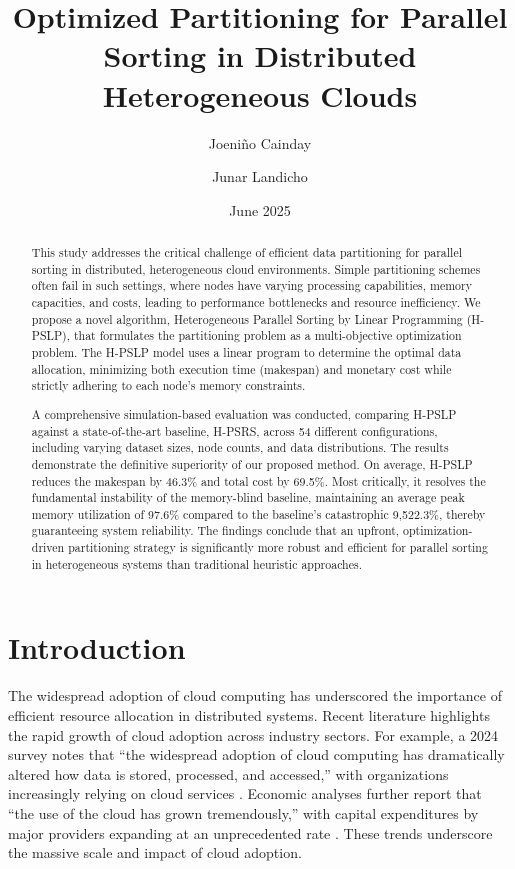 \documentclass{article}
\title{Optimized Partitioning for Parallel Sorting in Distributed Heterogeneous Clouds}
\author[]{Joeniño Cainday}
\author[]{Junar Landicho}
\affil[]{University of Science and Technology of Southern Philippines, Cagayan de Oro, 9000, Philippines}
\date{June 2025}
\begin{document}
\maketitle

\begin{abstract}
This study addresses the critical challenge of efficient data partitioning for parallel sorting in distributed, heterogeneous cloud environments.  Simple partitioning schemes often fail in such settings, where nodes have varying processing capabilities, memory capacities, and costs, leading to performance bottlenecks and resource inefficiency.  We propose a novel algorithm, Heterogeneous Parallel Sorting by Linear Programming (H-PSLP), that formulates the partitioning problem as a multi-objective optimization problem.  The H-PSLP model uses a linear program to determine the optimal data allocation, minimizing both execution time (makespan) and monetary cost while strictly adhering to each node's memory constraints. 

A comprehensive simulation-based evaluation was conducted, comparing H-PSLP against a state-of-the-art baseline, H-PSRS, across 54 different configurations, including varying dataset sizes, node counts, and data distributions.  The results demonstrate the definitive superiority of our proposed method. On average, H-PSLP reduces the makespan by 46.3\% and total cost by 69.5\%.  Most critically, it resolves the fundamental instability of the memory-blind baseline, maintaining an average peak memory utilization of 97.6\% compared to the baseline's catastrophic 9,522.3\%, thereby guaranteeing system reliability.  The findings conclude that an upfront, optimization-driven partitioning strategy is significantly more robust and efficient for parallel sorting in heterogeneous systems than traditional heuristic approaches. 
\end{abstract}

\vspace{3em}

\section{Introduction}

The widespread adoption of cloud computing has underscored the importance of efficient resource allocation in distributed systems. Recent literature highlights the rapid growth of cloud adoption across industry sectors. For example, a 2024 survey notes that ``the widespread adoption of cloud computing has dramatically altered how data is stored, processed, and accessed,'' with organizations increasingly relying on cloud services \cite{gptclaim1}. Economic analyses further report that ``the use of the cloud has grown tremendously,'' with capital expenditures by major providers expanding at an unprecedented rate \cite{gptclaim2}. These trends underscore the massive scale and impact of cloud adoption.
\end{document}
